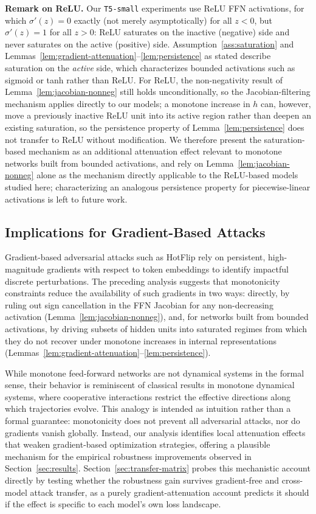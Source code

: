 \documentclass{article}
\theoremstyle{plain}
\theoremstyle{definition}
\theoremstyle{remark}
\begin{document}
\textbf{Remark on ReLU.} Our \texttt{T5-small} experiments use ReLU FFN
activations, for which $\sigma'(z)=0$ exactly (not merely asymptotically) for
all $z<0$, but $\sigma'(z)=1$ for all $z>0$: ReLU saturates on the inactive
(negative) side and never saturates on the active (positive) side. Assumption~\ref{ass:saturation}
and Lemmas~\ref{lem:gradient-attenuation}--\ref{lem:persistence} as stated
describe saturation on the \emph{active} side, which characterizes bounded
activations such as sigmoid or tanh rather than ReLU. For ReLU, the
non-negativity result of Lemma~\ref{lem:jacobian-nonneg} still holds
unconditionally, so the Jacobian-filtering mechanism applies directly to our
models; a monotone increase in $h$ can, however, move a previously inactive
ReLU unit into its active region rather than deepen an existing saturation, so
the persistence property of Lemma~\ref{lem:persistence} does not transfer
to ReLU without modification. We therefore present the saturation-based
mechanism as an additional attenuation effect relevant to monotone networks
built from bounded activations, and rely on Lemma~\ref{lem:jacobian-nonneg}
alone as the mechanism directly applicable to the ReLU-based models studied
here; characterizing an analogous persistence property for piecewise-linear
activations is left to future work.

\subsection{Implications for Gradient-Based Attacks}

Gradient-based adversarial attacks such as HotFlip rely on persistent,
high-magnitude gradients with respect to token embeddings to identify impactful
discrete perturbations. The preceding analysis suggests that monotonicity
constraints reduce the availability of such gradients in two ways: directly,
by ruling out sign cancellation in the FFN Jacobian for any non-decreasing
activation (Lemma~\ref{lem:jacobian-nonneg}), and, for networks built from
bounded activations, by driving subsets of hidden units into saturated regimes
from which they do not recover under monotone increases in internal
representations (Lemmas~\ref{lem:gradient-attenuation}--\ref{lem:persistence}).

While monotone feed-forward networks are not dynamical systems in the formal
sense, their behavior is reminiscent of classical results in monotone dynamical
systems, where cooperative interactions restrict the effective directions along
which trajectories evolve. This analogy is intended as intuition rather than a
formal guarantee: monotonicity does not prevent all adversarial attacks, nor do
gradients vanish globally. Instead, our analysis identifies local attenuation
effects that weaken gradient-based optimization strategies, offering a plausible
mechanism for the empirical robustness improvements observed in
Section~\ref{sec:results}. Section~\ref{sec:transfer-matrix} probes this
mechanistic account directly by testing whether the robustness gain survives
gradient-free and cross-model attack transfer, as a purely gradient-attenuation
account predicts it should if the effect is specific to each model's own loss
landscape.
\end{document}
